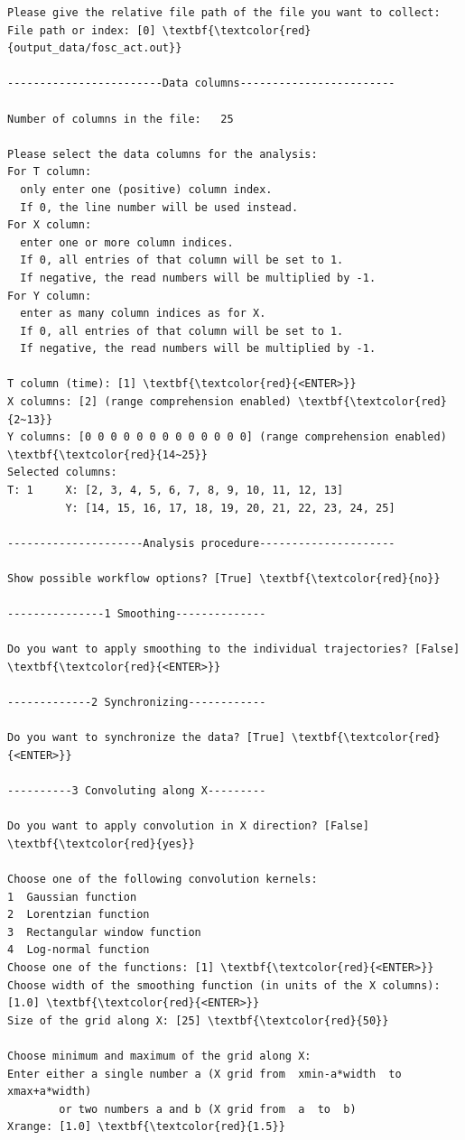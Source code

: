 \documentclass[a4paper,11pt,DIV=15,openany]{scrbook}
\begin{document}
\begin{oframed}
\begin{Verbatim}[commandchars=\\\{\}]
Please give the relative file path of the file you want to collect:
File path or index: [0] \textbf{\textcolor{red}{output_data/fosc_act.out}}

------------------------Data columns------------------------

Number of columns in the file:   25

Please select the data columns for the analysis:
For T column: 
  only enter one (positive) column index. 
  If 0, the line number will be used instead.
For X column: 
  enter one or more column indices. 
  If 0, all entries of that column will be set to 1. 
  If negative, the read numbers will be multiplied by -1.
For Y column: 
  enter as many column indices as for X. 
  If 0, all entries of that column will be set to 1. 
  If negative, the read numbers will be multiplied by -1.

T column (time): [1] \textbf{\textcolor{red}{<ENTER>}}
X columns: [2] (range comprehension enabled) \textbf{\textcolor{red}{2~13}}
Y columns: [0 0 0 0 0 0 0 0 0 0 0 0 0] (range comprehension enabled) \textbf{\textcolor{red}{14~25}}
Selected columns:
T: 1     X: [2, 3, 4, 5, 6, 7, 8, 9, 10, 11, 12, 13]    
         Y: [14, 15, 16, 17, 18, 19, 20, 21, 22, 23, 24, 25]

---------------------Analysis procedure---------------------

Show possible workflow options? [True] \textbf{\textcolor{red}{no}}

---------------1 Smoothing--------------

Do you want to apply smoothing to the individual trajectories? [False] \textbf{\textcolor{red}{<ENTER>}}

-------------2 Synchronizing------------

Do you want to synchronize the data? [True] \textbf{\textcolor{red}{<ENTER>}}

----------3 Convoluting along X---------

Do you want to apply convolution in X direction? [False] \textbf{\textcolor{red}{yes}}

Choose one of the following convolution kernels:
1  Gaussian function
2  Lorentzian function
3  Rectangular window function
4  Log-normal function
Choose one of the functions: [1] \textbf{\textcolor{red}{<ENTER>}}
Choose width of the smoothing function (in units of the X columns): [1.0] \textbf{\textcolor{red}{<ENTER>}}
Size of the grid along X: [25] \textbf{\textcolor{red}{50}}

Choose minimum and maximum of the grid along X:
Enter either a single number a (X grid from  xmin-a*width  to  xmax+a*width)
        or two numbers a and b (X grid from  a  to  b)
Xrange: [1.0] \textbf{\textcolor{red}{1.5}}


\end{Verbatim}
\end{oframed}
\end{document}
